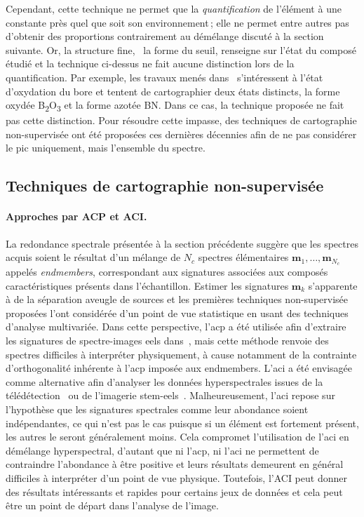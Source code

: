     Cependant, cette technique ne permet que la \emph{quantification} de l'élément à une constante près quel que soit son environnement\,; elle ne permet entre autres pas d'obtenir des proportions contrairement au démélange discuté à la section suivante. Or, la structure fine, \ie\ la forme du seuil, renseigne sur l'état du composé étudié et la technique ci-dessus ne fait aucune distinction lors de la quantification. Par exemple, les travaux menés dans~\cite{dobigeon2012spectral} s'intéressent à l'état d'oxydation du bore et tentent de cartographier deux états distincts, la forme oxydée B\textsubscript{2}O\textsubscript{3} et la forme azotée BN. Dans ce cas, la technique proposée ne fait pas cette distinction.
    Pour résoudre cette impasse, des techniques de cartographie non-supervisée ont été proposées ces dernières décennies afin de ne pas considérer le pic uniquement, mais l'ensemble du spectre.

    

    \subsection{Techniques de cartographie non-supervisée}\label{sec-demelange}
    
    \paragraph{Approches par ACP et ACI.} La redondance spectrale présentée à la section précédente suggère que les spectres acquis soient le résultat d'un mélange de $N_c$ spectres élémentaires $\mathbf{m}_1,\dots,\mathbf{m}_{N_c}$ appelés \emph{endmembers}, correspondant aux signatures associées aux composés caractéristiques présents dans l'échantillon.
    Estimer les signatures $\mathbf{m}_k$ s'apparente à de la séparation aveugle de sources et les premières techniques non-supervisée proposées l'ont considérée d'un point de vue statistique en usant des techniques d'analyse multivariée. Dans cette perspective, l'\gls{acp} a été utilisée afin d'extraire les signatures de spectre-images \gls{eels} dans~\cite{bonnet1999extracting, bosman2006mapping, trebbia1990eels}, mais cette méthode renvoie des spectres difficiles à interpréter physiquement, à cause notamment de la contrainte d'orthogonalité inhérente à l'\gls{acp} imposée aux endmembers. L'\gls{aci} a été envisagée comme alternative afin d'analyser les données hyperspectrales issues de la télédétection~\cite{bayliss1998analyzing, chen1999independent} ou de l'imagerie \gls{stem}-\gls{eels}~\cite{delapena2011mapping, bonnet2005independent, bosman2006mapping}. Malheureusement, l'\gls{aci} repose sur l'hypothèse que les signatures spectrales comme leur abondance soient indépendantes, ce qui n'est pas le cas puisque si un élément est fortement présent, les autres le seront généralement moins. Cela compromet l'utilisation de l'\gls{aci} en démélange hyperspectral, d'autant que ni l'\gls{acp}, ni l'\gls{aci} ne permettent de contraindre l'abondance à être positive et leurs résultats demeurent en général difficiles à interpréter d'un point de vue physique. Toutefois, l'ACI peut donner des résultats intéressants et rapides pour certains jeux de données et cela peut être un point de départ dans l'analyse de l'image.
    
